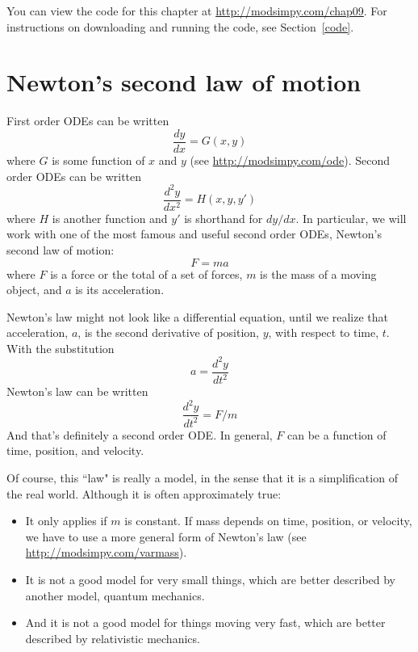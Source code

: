 \documentclass[12pt]{book}
\theoremstyle{exercise}
\begin{document}
You can view the code for this chapter at \url{http://modsimpy.com/chap09}.  For instructions on downloading and running the code, see Section~\ref{code}.


\section{Newton's second law of motion}

First order ODEs can be written
%
\[ \frac{dy}{dx} = G(x, y) \]
%
where $G$ is some function of $x$ and $y$ (see \url{http://modsimpy.com/ode}).  Second order ODEs can be written
%
\[ \frac{d^2y}{dx^2} = H(x, y, y') \]
%
where $H$ is another function and $y'$ is shorthand for $dy/dx$.  In particular, we will work with one of the most famous and useful second order ODEs, Newton's second law of motion:
%
\[ F = m a \]
%
where $F$ is a force or the total of a set of forces, $m$ is the mass of a moving object, and $a$ is its acceleration.

Newton's law might not look like a differential equation, until we realize that acceleration, $a$, is the second derivative of position, $y$, with respect to time, $t$.  With the substitution
%
\[ a = \frac{d^2y}{dt^2} \]
%
Newton's law can be written
%
\[ \frac{d^2y}{dt^2} = F / m \]
%
And that's definitely a second order ODE.  In general, $F$ can be a function of time, position, and velocity.

Of course, this ``law" is really a model, in the sense that it is a simplification of the real world.  Although it is often approximately true:

\begin{itemize}

\item It only applies if $m$ is constant.  If mass depends on time, position, or velocity, we have to use a more general form of Newton's law (see \url{http://modsimpy.com/varmass}).

\item It is not a good model for very small things, which are better described by another model, quantum mechanics.

\item And it is not a good model for things moving very fast, which are better described by relativistic mechanics.

\end{itemize}
\end{document}
